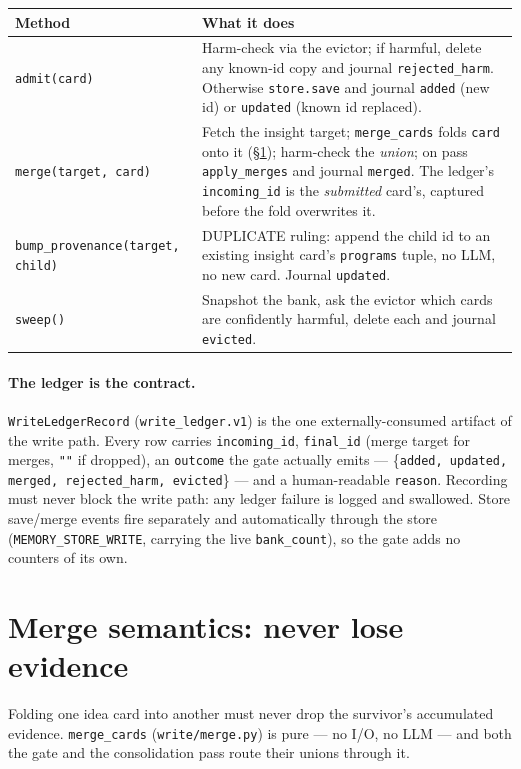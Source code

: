 \documentclass[11pt]{article}
\newcommand{\code}[1]{\texttt{\small #1}}
\begin{document}
\begin{longtable}{@{}p{}p{}@{}}
\toprule
\textbf{Method} & \textbf{What it does} \\
\midrule
\endhead
\code{admit(card)} & Harm-check via the evictor; if harmful, delete any known-id
copy and journal \code{rejected\_harm}. Otherwise \code{store.save} and journal
\code{added} (new id) or \code{updated} (known id replaced). \\
\code{merge(target, card)} & Fetch the insight target; \code{merge\_cards} folds
\code{card} onto it (\S\ref{sec:merge}); harm-check the \emph{union}; on pass
\code{apply\_merges} and journal \code{merged}. The ledger's \code{incoming\_id}
is the \emph{submitted} card's, captured before the fold overwrites it. \\
\code{bump\_provenance(target, child)} & DUPLICATE ruling: append the child id to
an existing insight card's \code{programs} tuple, no LLM, no new card. Journal
\code{updated}. \\
\code{sweep()} & Snapshot the bank, ask the evictor which cards are confidently
harmful, delete each and journal \code{evicted}. \\
\bottomrule
\end{longtable}

\paragraph{The ledger is the contract.} \code{WriteLedgerRecord}
(\code{write\_ledger.v1}) is the one externally-consumed artifact of the write
path. Every row carries \code{incoming\_id}, \code{final\_id} (merge target for
merges, \code{""} if dropped), an \code{outcome} the gate actually emits ---
\{\code{added, updated, merged, rejected\_harm, evicted}\} --- and a human-readable
\code{reason}. Recording must never block the write path: any ledger failure is
logged and swallowed. Store save/merge events fire separately and automatically
through the store (\code{MEMORY\_STORE\_WRITE}, carrying the live
\code{bank\_count}), so the gate adds no counters of its own.

\section{Merge semantics: never lose evidence}
\label{sec:merge}

Folding one idea card into another must never drop the survivor's accumulated
evidence. \code{merge\_cards} (\code{write/merge.py}) is pure --- no I/O, no LLM
--- and both the gate and the consolidation pass route their unions through it.
\end{document}
